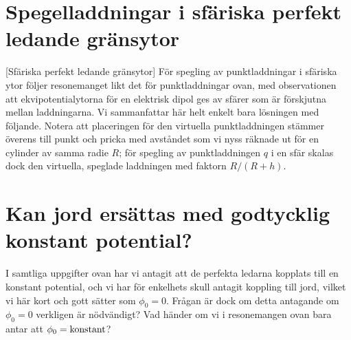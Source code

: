 {\section{Spegelladdningar i sf{\"a}riska perfekt ledande gr{\"a}nsytor}
[Sf{\"a}riska perfekt ledande gr{\"a}nsytor]
F{\"o}r spegling av punktladdningar i sf{\"a}riska ytor f{\"o}ljer resonemanget
likt det f{\"o}r punktladdningar ovan, med observationen att ekvipotentialytorna
f{\"o}r en elektrisk dipol ges av sf{\"a}rer som {\"a}r f{\"o}r\-skjutna mellan
laddningarna.
Vi sammanfattar h{\"a}r helt enkelt bara l{\"o}sningen med f{\"o}ljande.
\noindent
Notera att placeringen f{\"o}r den virtuella punktladdningen st{\"a}mmer
{\"o}verens till punkt och pricka med avst{\aa}ndet som vi nyss r{\"a}knade
ut f{\"o}r en cylinder av samma radie $R$; f{\"o}r spegling av punktladdningen
$q$ i en sf{\"a}r skalas dock den virtuella, speglade laddningen med faktorn
$R/(R+h)$.

\section{Kan jord ers{\"a}ttas med godtycklig konstant potential?}
I samtliga uppgifter ovan har vi antagit att de perfekta ledarna kopplats till
en konstant potential, och vi har f{\"o}r enkelhets skull antagit koppling till
jord, vilket vi h{\"a}r kort och gott s{\"a}tter som $\phi_0=0$.
Fr{\aa}gan {\"a}r dock om detta antagande om $\phi_0=0$ verkligen {\"a}r
n{\"o}dv{\"a}ndigt? Vad h{\"a}nder om vi i resonemangen ovan bara antar att
$\phi_0=\hbox{konstant}$?
\vfill\eject

}
